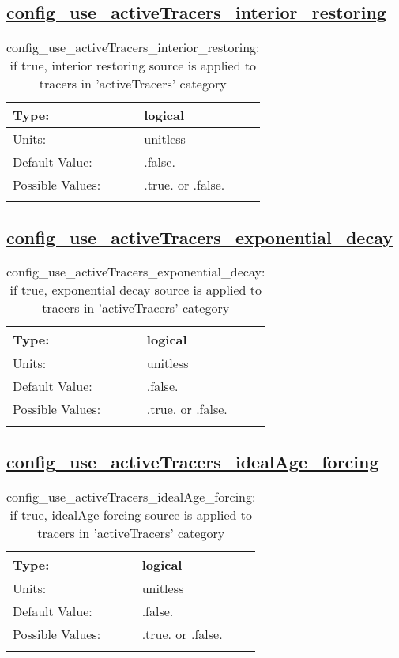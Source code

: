 \subsection[config\_use\_activeTracers\_interior\_restoring]{\hyperref[sec:nm_tab_tracer_forcing_activeTracers]{config\_use\_activeTracers\_interior\_restoring}}
\label{subsec:nm_sec_config_use_activeTracers_interior_restoring}
\begin{center}
\begin{longtable}{| p{2.0in} || p{4.0in} |}
    \hline
    Type: & logical \\
    \hline
    Units: & \si{unitless} \\
    \hline
    Default Value: & .false. \\
    \hline
    Possible Values: & .true. or .false. \\
    \hline
    \caption{config\_use\_activeTracers\_interior\_restoring: if true, interior restoring source is applied to tracers in 'activeTracers' category}
\end{longtable}
\end{center}
\subsection[config\_use\_activeTracers\_exponential\_decay]{\hyperref[sec:nm_tab_tracer_forcing_activeTracers]{config\_use\_activeTracers\_exponential\_decay}}
\label{subsec:nm_sec_config_use_activeTracers_exponential_decay}
\begin{center}
\begin{longtable}{| p{2.0in} || p{4.0in} |}
    \hline
    Type: & logical \\
    \hline
    Units: & \si{unitless} \\
    \hline
    Default Value: & .false. \\
    \hline
    Possible Values: & .true. or .false. \\
    \hline
    \caption{config\_use\_activeTracers\_exponential\_decay: if true, exponential decay source is applied to tracers in 'activeTracers' category}
\end{longtable}
\end{center}
\subsection[config\_use\_activeTracers\_idealAge\_forcing]{\hyperref[sec:nm_tab_tracer_forcing_activeTracers]{config\_use\_activeTracers\_idealAge\_forcing}}
\label{subsec:nm_sec_config_use_activeTracers_idealAge_forcing}
\begin{center}
\begin{longtable}{| p{2.0in} || p{4.0in} |}
    \hline
    Type: & logical \\
    \hline
    Units: & \si{unitless} \\
    \hline
    Default Value: & .false. \\
    \hline
    Possible Values: & .true. or .false. \\
    \hline
    \caption{config\_use\_activeTracers\_idealAge\_forcing: if true, idealAge forcing source is applied to tracers in 'activeTracers' category}
\end{longtable}
\end{center}
